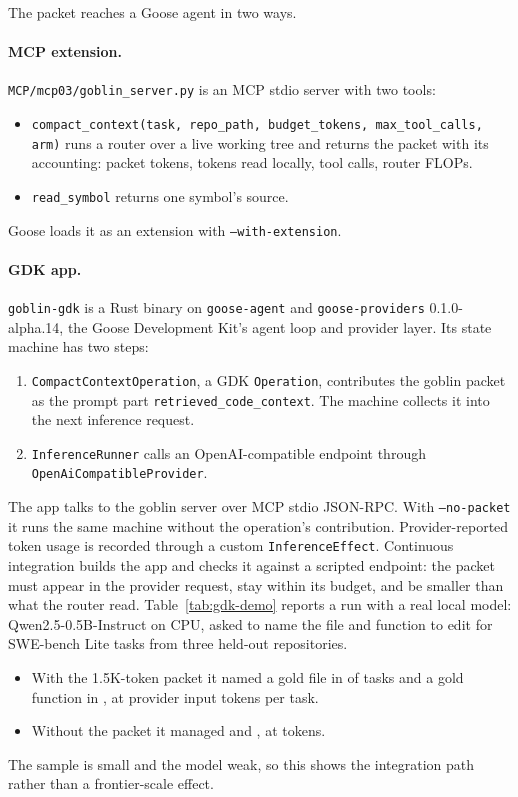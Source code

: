 The packet reaches a Goose agent in two ways.

\paragraph{MCP extension.} \texttt{MCP/mcp03/goblin\_server.py} is an MCP stdio server with two tools:
\begin{itemize}
\item \texttt{compact\_context(task, repo\_path, budget\_tokens, max\_tool\_calls, arm)} runs a router over a live
working tree and returns the packet with its accounting: packet tokens, tokens read locally, tool calls, router FLOPs.
\item \texttt{read\_symbol} returns one symbol's source.
\end{itemize}
Goose loads it as an extension with \texttt{--with-extension}.

\paragraph{GDK app.} \texttt{goblin-gdk} is a Rust binary on \texttt{goose-agent} and \texttt{goose-providers}
0.1.0-alpha.14, the Goose Development Kit's agent loop and provider layer. Its state machine has two steps:
\begin{enumerate}
\item \texttt{CompactContextOperation}, a GDK \texttt{Operation}, contributes the goblin packet as the prompt part
\texttt{retrieved\_code\_context}. The machine collects it into the next inference request.
\item \texttt{InferenceRunner} calls an OpenAI-compatible endpoint through \texttt{OpenAiCompatibleProvider}.
\end{enumerate}
The app talks to the goblin server over MCP stdio JSON-RPC. With \texttt{--no-packet} it runs the same machine
without the operation's contribution. Provider-reported token usage is recorded through a custom
\texttt{InferenceEffect}. Continuous integration builds the app and checks it against a scripted endpoint: the packet
must appear in the provider request, stay within its budget, and be smaller than what the router read.
Table~\ref{tab:gdk-demo} reports a run with a real local model: Qwen2.5-0.5B-Instruct on CPU, asked to name the
file and function to edit for SWE-bench Lite tasks from three held-out repositories.
\begin{itemize}
\item With the 1.5K-token packet it named a gold file in \GdkPacketFileNamed{} of \GdkPacketRuns{} tasks and a gold
function in \GdkPacketFunctionNamed{}, at \GdkPacketInputTokens{} provider input tokens per task.
\item Without the packet it managed \GdkNoPacketFileNamed{} and \GdkNoPacketFunctionNamed{}, at \GdkNoPacketInputTokens{}
tokens.
\end{itemize}
The sample is small and the model weak, so this shows the integration path rather than a frontier-scale effect.

